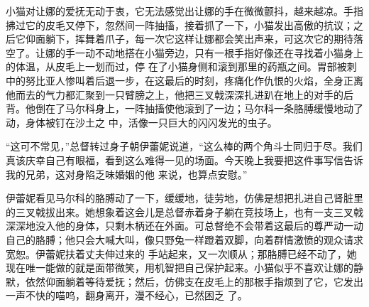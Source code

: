 \documentclass{article}
\begin{document}
小猫对让娜的爱抚无动于衷，它无法感觉出让娜的手在微微颤抖，越来越凉。手指拂过它的皮毛又停下，忽然间一阵抽搐，接着抓了一下，小猫发出高傲的抗议；之后它仰面躺下，挥舞着爪子，每一次它这样让娜都会笑出声来，可这次它的期待落空了。让娜的手一动不动地搭在小猫旁边，只有一根手指好像还在寻找着小猫身上的体温，从皮毛上一划而过，停
\newpage
在了小猫身侧和滚到那里的药瓶之间。胃部被刺中的努比亚人惨叫着后退一步，在这最后的时刻，疼痛化作仇恨的火焰，全身正离他而去的气力都汇聚到一只臂膀之上，他把三叉戟深深扎进趴在地上的对手的后背。他倒在了马尔科身上，一阵抽搐使他滚到了一边；马尔科一条胳膊缓慢地动了动，身体被钉在沙土之
中，活像一只巨大的闪闪发光的虫子。 

“这可不常见，”总督转过身子朝伊蕾妮说道，“这么棒的两个角斗士同归于尽。我们真该庆幸自己有眼福，看到这么难得一见的场面。今天晚上我要把这件事写信告诉我的兄弟，这对身陷乏味婚姻的他
来说，也算点安慰。” 

伊蕾妮看见马尔科的胳膊动了一下，缓缓地，徒劳地，仿佛是想把扎进自己肾脏里的三叉戟拔出来。她想象着这会儿是总督赤着身子躺在竞技场上，也有一支三叉戟深深地没入他的身体，只剩木柄还在外面。可总督绝不会带着这最后的尊严动一动自己的胳膊；他只会大喊大叫，像只野兔一样蹬着双脚，向着群情激愤的观众请求宽恕。伊蕾妮扶着丈夫伸过来的
\newpage
手站起来，又一次顺从；那胳膊已经不动了，她现在唯一能做的就是面带微笑，用机智把自己保护起来。小猫似乎不喜欢让娜的静默，依然仰面躺着等待爱抚；然后，仿佛支在皮毛上的那根手指烦到了它，它发出一声不快的喵呜，翻身离开，漫不经心，已然困乏
了。 
\end{document}
